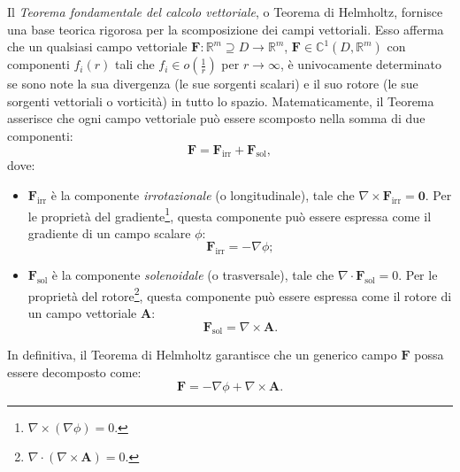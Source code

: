\documentclass[a4paper,11pt]{report}
\begin{document}
\begin{approfondimento}[colback= white, colframe=green!35!black, no shadow, title={Il Teorema di Helmholtz}]
Il \textit{Teorema fondamentale del calcolo vettoriale}, o Teorema di Helmholtz, fornisce una base teorica rigorosa per la scomposizione dei campi vettoriali. Esso afferma che un qualsiasi campo vettoriale $\bm{F} : \mathbb{R}^m \supseteq D \rightarrow \mathbb{R}^m$, $\bm{F} \in \mathbb{C}^1(D, \mathbb{R}^m)$ con componenti $f_i(r)$ tali che $f_i \in o(\frac{1}{r})$ per $r \rightarrow \infty$, è univocamente determinato se sono note la sua divergenza (le sue sorgenti scalari) e il suo rotore (le sue sorgenti vettoriali o vorticità) in tutto lo spazio.
Matematicamente, il Teorema asserisce che ogni campo vettoriale può essere scomposto nella somma di due componenti:
\begin{equation}
    \bm{F} = \bm{F}_{\text{irr}} + \bm{F}_{\text{sol}},
\end{equation}
dove:
\begin{itemize}
    \item $\bm{F}_{\text{irr}}$ è la componente \textit{irrotazionale} (o longitudinale), tale che $\nabla \times \bm{F}_{\text{irr}} = \bm{0}$. Per le proprietà del gradiente\footnote{$\nabla \times (\nabla \phi) = 0.$}, questa componente può essere espressa come il gradiente di un campo scalare $\phi$:
    \begin{equation}
        \bm{F}_{\text{irr}} = -\nabla \phi;
    \end{equation}
    \item $\bm{F}_{\text{sol}}$ è la componente \textit{solenoidale} (o trasversale), tale che $\nabla \cdot \bm{F}_{\text{sol}} = 0$. Per le proprietà del rotore\footnote{$\nabla \cdot (\nabla \times \bm{A}) = 0.$}, questa componente può essere espressa come il rotore di un campo vettoriale $\bm{A}$:
    \begin{equation}
        \bm{F}_{\text{sol}} = \nabla \times \bm{A}.
    \end{equation}
\end{itemize}
In definitiva, il Teorema di Helmholtz garantisce che un generico campo $\bm{F}$ possa essere decomposto come:
\begin{equation}
    \bm{F} = -\nabla \phi + \nabla \times \bm{A}.
    \end{equation}
\end{approfondimento}
\end{document}
